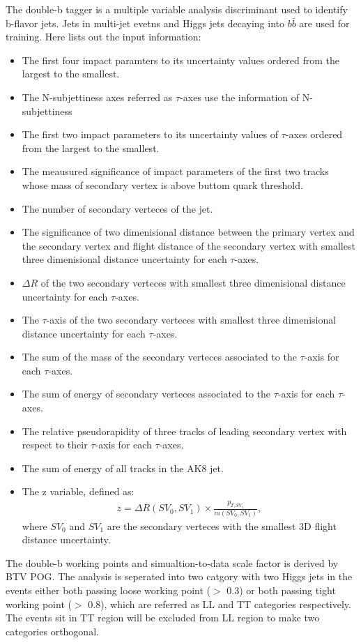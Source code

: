 The double-b tagger is a multiple variable analysis discriminant used to identify b-flavor jets. Jets in multi-jet evetns and Higgs jets decaying into $b\bar{b}$ are used for training. Here lists out the input information:
\begin{itemize}
\item The first four impact paramters to its uncertainty values ordered from the largest to the smallest.
\item The  N-subjettiness axes referred as $\tau $-axes use the information of N-subjettiness
\item The first two impact parameters to its uncertainty values of $\tau $-axes ordered from the largest to the smallest.
\item The meausured significance of impact parameters of the first two tracks whose mass of secondary vertex is above buttom quark threshold.
\item The number of secondary verteces of the jet.
\item The significance of two dimenisional distance between the primary vertex and the secondary vertex and flight distance of the secondary vertex with smallest three dimenisional distance uncertainty for each $\tau $-axes.
\item $\Delta R$ of the two secondary verteces with smallest three dimenisional distance uncertainty for each $\tau $-axes.
\item The $\tau $-axis of the two secondary verteces with smallest three dimenisional distance uncertainty for each $\tau $-axes.
\item The sum of the mass of the secondary verteces associated to the $\tau $-axis for each $\tau $-axes.
\item The sum of energy of secondary verteces associated to the $\tau $-axis for each $\tau $-axes.
\item The relative pseudorapidity of three tracks of leading secondary vertex with respect to their $\tau $-axis for each $\tau $-axes.
\item The sum of energy of all tracks in the AK8 jet.
\item The z variable, defined as: 
\begin{equation} \label{eq7}
\begin{split}
z = \Delta R (SV_0, SV_1) \times \frac{p_{T,SV_1}}{m(SV_0,SV_1)}, 
\end{split}
\end{equation}
where $SV_0$ and $SV_1$ are the secondary verteces with the smallest 3D flight distance uncertainty.
\end{itemize} 
The double-b working points and simualtion-to-data scale factor is derived by BTV POG.
The analysis is seperated into two catgory with two Higgs jets in the events either both passing loose working point ($>$ 0.3) or both passing tight working point ($>$ 0.8), which are referred as LL and TT categories respectively. The events sit in TT region will be excluded from LL region to make two categories orthogonal.



